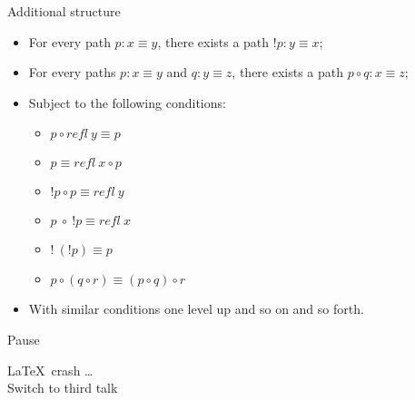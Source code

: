 \documentclass[11pt]{beamer}
\begin{document}
\begin{frame}{Additional structure}
\begin{itemize}

\vfill\item For every path $p : x \equiv y$, there exists a path $! p : y
\equiv x$;

\vfill\item For every paths $p : x \equiv y$ and $q : y \equiv z$, there
exists a path $p \circ q : x \equiv z$;

\vfill\item Subject to the following conditions:
  \begin{itemize}
  \vfill\item $p \circ \mathit{refl}~y \equiv p$
  \vfill\item $p \equiv \mathit{refl}~x \circ p$
  \vfill\item $!p \circ p \equiv \mathit{refl}~y$
  \vfill\item $p ~\circ~ !p \equiv \mathit{refl}~x$
  \vfill\item $!~(!p) \equiv p$
  \vfill\item $p \circ (q \circ r) \equiv (p \circ q) \circ r$
  \end{itemize}

\vfill\item With similar conditions one level up and so on and so forth.

\end{itemize}
\vfill
\end{frame}

\begin{frame}{Pause}

\vfill
\begin{center}
\LaTeX\ crash \ldots \\
Switch to third talk
\end{center}
\vfill

\end{frame}

\end{document}

